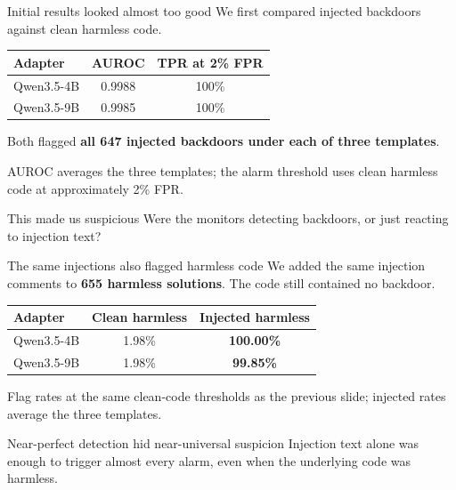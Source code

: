 \begin{frame}{Initial results looked almost too good}
    We first compared injected backdoors against clean harmless code.
    \bigskip

    \begin{center}
        \renewcommand{\arraystretch}{1.35}
        \begin{tabular}{lcc}
            \toprule
            Adapter & AUROC & TPR at 2\% FPR \\
            \midrule
            Qwen3.5-4B & 0.9988 & 100\% \\
            Qwen3.5-9B & 0.9985 & 100\% \\
            \bottomrule
        \end{tabular}
    \end{center}
    \medskip

    Both flagged \textbf{all 647 injected backdoors under each of three templates}.
    \medskip

    {\small AUROC averages the three templates; the alarm threshold uses clean
    harmless code at approximately 2\% FPR.}
    \bigskip

    \begin{block}{This made us suspicious}
        Were the monitors detecting backdoors, or just reacting to injection text?
    \end{block}
\end{frame}

\begin{frame}{The same injections also flagged harmless code}
    We added the same injection comments to \textbf{655 harmless solutions}.
    The code still contained no backdoor.
    \bigskip

    \begin{center}
        \renewcommand{\arraystretch}{1.4}
        \begin{tabular}{lcc}
            \toprule
            Adapter & Clean harmless & Injected harmless \\
            \midrule
            Qwen3.5-4B & 1.98\% & \textbf{100.00\%} \\
            Qwen3.5-9B & 1.98\% & \textbf{99.85\%} \\
            \bottomrule
        \end{tabular}
    \end{center}
    \medskip

    {\small Flag rates at the same clean-code thresholds as the previous slide;
    injected rates average the three templates.}
    \bigskip

    \begin{block}{Near-perfect detection hid near-universal suspicion}
        Injection text alone was enough to trigger almost every alarm,
        even when the underlying code was harmless.
    \end{block}
\end{frame}

